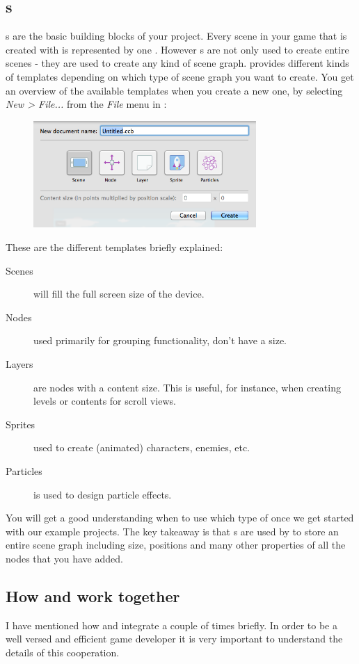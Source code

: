 \subsection{\ccbfile{}s}
\ccbfile{}s are the basic building blocks of your \SB{} project. Every scene in
your game that is created with \SB{} is represented by one \ccbfile{}. However
\ccbfile{}s are not only used to create entire scenes - they are used to create
any kind of scene graph. \SB{} provides different kinds of templates depending
on which type of scene graph you want to create. You get an overview of the
available \ccbfile{} templates when you create a new one, by selecting
\textit{New > File... } from the \textit{File} menu in \SB{}:
\begin{figure}[H]
		\centering
		\includegraphics[width=240pt]{images/spritebuilder/new-ccb.png}     
\end{figure} 
These are the different templates briefly explained:
\begin{description}
\item[Scenes] will fill the full screen size of the device.
\item[Nodes] used primarily for grouping functionality, don't have a size.
\item[Layers] are nodes with a content size. This is useful, for instance, when
creating levels or contents for scroll views.
\item[Sprites] used to create (animated) characters, enemies, etc.
\item[Particles] is used to design particle effects.
\end{description}
You will get a good understanding when to use which type of \ccbfile{} once we
get started with our example projects. The key takeaway is that \ccbfile{}s are
used by \SB{} to store an entire scene graph including size, positions and many
other properties of all the nodes that you have added.

\subsection{How \SB{} and \xcode{} work together}
I have mentioned how \SB{} and \xcode{} integrate a couple of times briefly. In
order to be a well versed and efficient \SB{} game developer it is very
important to understand the details of this cooperation.

